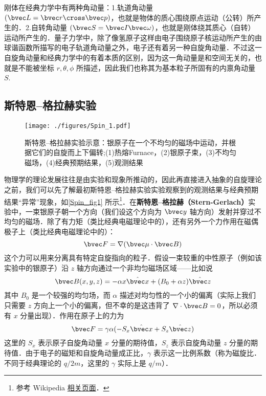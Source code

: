 
\begin{issues}
\issueDraft
\end{issues}


刚体在经典力学中有两种角动量：1.轨道角动量 $(\bvec L = \bvec r\cross\bvec p)$，也就是物体的质心围绕原点运动（公转）所产生的．2.自转角动量 $(\bvec S = \bvec I\bvec\omega)$，也就是刚体绕其质心（自转）运动所产生的．量子力学中，除了像氢原子这样由电子围绕原子核运动所产生的由球谐函数所描写的电子轨道角动量之外，电子还有着另一种自旋角动量．不过这一自旋角动量和经典力学中的有着本质的区别，因为这一角动量是和空间无关的，也就是不能被坐标 $r,\theta,\phi$ 所描述，因此我们也称其为基本粒子所固有的内禀角动量 $S$. 

\subsection{斯特恩–格拉赫实验}
\begin{figure}[ht]
\centering
\texttt{[image: ./figures/Spin\_1.pdf]}
\caption{斯特恩–格拉赫实验示意：银原子在一个不均匀的磁场中运动，并根据它们的自旋而上下偏转;(1)热熔Furnace，(2)银原子束，(3)不均匀磁场，(4)经典预期结果，(5)观测结果} \label{Spin_fig1}
\end{figure}

物理学的理论发展往往是由实验和现象所推动的，因此再直接进入抽象的自旋理论之前，我们可以先了解最初斯特恩–格拉赫实验实验观察到的观测结果与经典预期结果“异常”现象，如\autoref{Spin_fig1} 所示\footnote{参考 Wikipedia \href{https://en.wikipedia.org/wiki/Stern–Gerlach_experiment}{相关页面}．}．在\textbf{斯特恩–格拉赫（Stern-Gerlach）}实验中，一束银原子朝一个方向（我们设这个方向为 $\bvec y$ 轴方向）发射并穿过不均匀的磁场．除了有力矩（类比经典电磁理论中的），还有另外一个力作用在磁偶极子上（类比经典电磁理论中的）：
\begin{equation}\label{Spin_eq1}
\bvec F=\nabla(\bvec \mu\cdot \bvec B)
\end{equation}
这个力可以用来分离具有特定自旋指向的粒子．假设一束较重的中性原子（例如该实验中的银原子）沿 $z$ 轴方向通过一个非均匀磁场区域——比如说
\begin{equation}\label{Spin_eq2}
\bvec B(x,y,z)=-\alpha x \hat{\bvec x}+(B_0+\alpha z)\hat {\bvec z}
\end{equation}
其中 $B_0$ 是一个较强的均匀场，而 $\alpha$ 描述对均匀性的一个小的偏离（实际上我们只需要 $z$ 方向上一个小的偏离，但不幸的是这违背了 $\nabla\cdot \bvec B=0$，所以必须有 $x$ 分量出现）．作用在原子上的力为
\begin{equation}
\bvec F=\gamma \alpha (-S_x \hat{\bvec x}+S_z\hat{\bvec z})
\end{equation}
这里的 $S_x$ 表示原子自旋角动量 $x$ 分量的期待值，$S_z$ 表示自旋角动量 $z$ 分量的期待值．由于电子的磁矩和自旋角动量成正比，$\gamma$ 表示这一比例系数（称为磁旋比．不同于经典理论的 $q/2m$，这里的 $\gamma$ 实际上是 $q/m$）．

